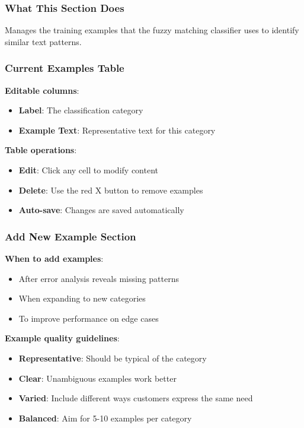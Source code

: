 \documentclass[11pt,a4paper]{article}
\begin{document}
\subsubsection{What This Section Does}
Manages the training examples that the fuzzy matching classifier uses to identify similar text patterns.

\subsubsection{Current Examples Table}
\textbf{Editable columns}:
\begin{itemize}
    \item \textbf{Label}: The classification category
    \item \textbf{Example Text}: Representative text for this category
\end{itemize}

\textbf{Table operations}:
\begin{itemize}
    \item \textbf{Edit}: Click any cell to modify content
    \item \textbf{Delete}: Use the red X button to remove examples
    \item \textbf{Auto-save}: Changes are saved automatically
\end{itemize}

\subsubsection{Add New Example Section}
\textbf{When to add examples}:
\begin{itemize}
    \item After error analysis reveals missing patterns
    \item When expanding to new categories
    \item To improve performance on edge cases
\end{itemize}

\textbf{Example quality guidelines}:
\begin{itemize}
    \item \textbf{Representative}: Should be typical of the category
    \item \textbf{Clear}: Unambiguous examples work better
    \item \textbf{Varied}: Include different ways customers express the same need
    \item \textbf{Balanced}: Aim for 5-10 examples per category
\end{itemize}
\end{document}

